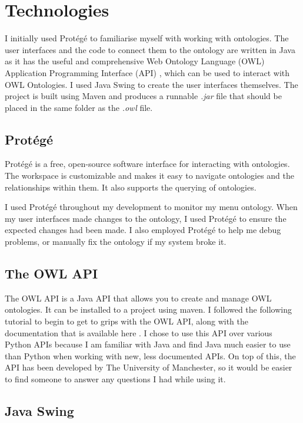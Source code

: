 \section{Technologies}

I initially used Protégé to familiarise myself with working with ontologies. The user interfaces and the code to connect them to the ontology are written in Java as it has the useful and comprehensive Web Ontology Language (OWL) Application Programming Interface (API) \cite{owl_api}, which can be used to interact with OWL Ontologies. I used Java Swing to create the user interfaces themselves. The project is built using Maven and produces a runnable \textit{.jar} file that should be placed in the same folder as the \textit{.owl} file.

\subsection{Protégé}

Protégé \cite{protege_2023} is a free, open-source software interface for interacting with ontologies. The workspace is customizable and makes it easy to navigate ontologies and the relationships within them. It also supports the querying of ontologies.

I used Protégé throughout my development to monitor my menu ontology. When my user interfaces made changes to the ontology, I used Protégé to ensure the expected changes had been made. I also employed Protégé to help me debug problems, or manually fix the ontology if my system broke it.

\subsection{The OWL API}

The OWL API is a Java API that allows you to create and manage OWL ontologies. It can be installed to a project using maven. I followed the following tutorial \cite{matenzoglu_palmisano_2016} to begin to get to grips with the OWL API, along with the documentation that is available here \cite{owl_api_doc_2023}. I chose to use this API over various Python APIs because I am familiar with Java and find Java much easier to use than Python when working with new, less documented APIs. On top of this, the API has been developed by The University of Manchester, so it would be easier to find someone to answer any questions I had while using it.

\subsection{Java Swing}

